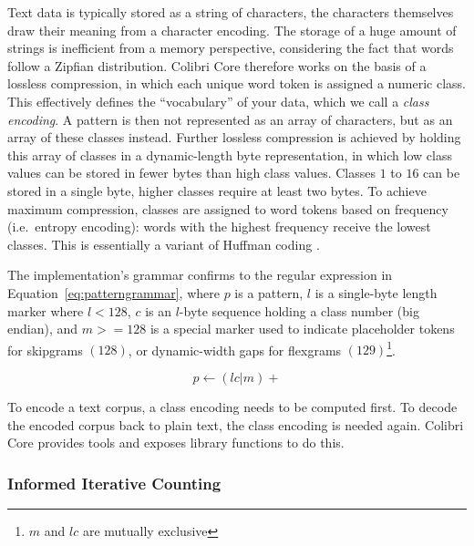 \documentclass[a4paper,12pt]{article}
\begin{document}
Text data is typically stored as a string of characters, the characters
themselves draw their meaning from a character encoding. The storage of a huge
amount of strings is inefficient from a memory perspective, considering the
fact that words follow a Zipfian distribution. Colibri Core therefore works on
the basis of a lossless compression, in which each unique word token is
assigned a numeric class. This effectively defines the ``vocabulary'' of your
data, which we call a \emph{class encoding}. A pattern is then not represented
as an array of characters, but as an array of these classes instead. Further
lossless compression is achieved by holding this array of classes in a
dynamic-length byte representation, in which low class values can be stored in
fewer bytes than high class values. Classes $1$ to $16$ can be stored in a
single byte, higher classes require at least two bytes. To achieve maximum
compression, classes are assigned to word tokens based on frequency (i.e.\
entropy encoding): words with the highest frequency receive the lowest classes.
This is essentially a variant of Huffman coding \citep{HUFFMAN}.

The implementation's grammar confirms to the regular expression in
Equation~\ref{eq:patterngrammar}, where $p$ is a pattern, $l$ is a single-byte
length marker where $l<128$, $c$ is an $l$-byte sequence holding a class number
(big endian), and $m>=128$ is a special marker used to indicate placeholder
tokens for skipgrams $(128)$, or dynamic-width gaps for flexgrams
$(129)$\footnote{$m$ and $lc$ are mutually exclusive}.

\begin{equation}
\label{eq:patterngrammar}
p \leftarrow (lc|m)+
\end{equation}

To encode a text corpus, a class encoding needs to be computed first. To decode
the encoded corpus back to plain text, the class encoding is needed again.
Colibri Core provides tools and exposes library functions to do this.

\subsubsection{Informed Iterative Counting}
\end{document}
